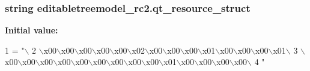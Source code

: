 \subsubsection[{qt\+\_\+resource\+\_\+struct}]{\setlength{\rightskip}{0pt plus 5cm}string editabletreemodel\+\_\+rc2.\+qt\+\_\+resource\+\_\+struct}\label{namespaceeditabletreemodel__rc2_a2129081b281999a0b9b01044723d555a}
{\bfseries Initial value\+:}
\begin{DoxyCode}
1 = \textcolor{stringliteral}{"\(\backslash\)}
2 \textcolor{stringliteral}{\(\backslash\)x00\(\backslash\)x00\(\backslash\)x00\(\backslash\)x00\(\backslash\)x00\(\backslash\)x02\(\backslash\)x00\(\backslash\)x00\(\backslash\)x00\(\backslash\)x01\(\backslash\)x00\(\backslash\)x00\(\backslash\)x00\(\backslash\)x01\(\backslash\)}
3 \textcolor{stringliteral}{\(\backslash\)x00\(\backslash\)x00\(\backslash\)x00\(\backslash\)x00\(\backslash\)x00\(\backslash\)x00\(\backslash\)x00\(\backslash\)x00\(\backslash\)x00\(\backslash\)x01\(\backslash\)x00\(\backslash\)x00\(\backslash\)x00\(\backslash\)x00\(\backslash\)}
4 \textcolor{stringliteral}{"}
\end{DoxyCode}
